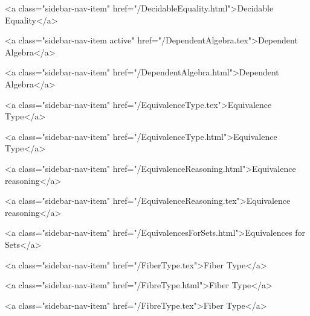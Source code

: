       
    
      
        
          <a class="sidebar-nav-item" href="/DecidableEquality.html">Decidable Equality</a>
        
      
    
      
        
          <a class="sidebar-nav-item active" href="/DependentAlgebra.tex">Dependent Algebra</a>
        
      
    
      
        
          <a class="sidebar-nav-item" href="/DependentAlgebra.html">Dependent Algebra</a>
        
      
    
      
        
          <a class="sidebar-nav-item" href="/EquivalenceType.tex">Equivalence Type</a>
        
      
    
      
        
          <a class="sidebar-nav-item" href="/EquivalenceType.html">Equivalence Type</a>
        
      
    
      
        
          <a class="sidebar-nav-item" href="/EquivalenceReasoning.html">Equivalence reasoning</a>
        
      
    
      
        
          <a class="sidebar-nav-item" href="/EquivalenceReasoning.tex">Equivalence reasoning</a>
        
      
    
      
        
          <a class="sidebar-nav-item" href="/EquivalencesForSets.html">Equivalences for Sets</a>
        
      
    
      
        
          <a class="sidebar-nav-item" href="/FiberType.tex">Fiber Type</a>
        
      
    
      
        
          <a class="sidebar-nav-item" href="/FibreType.html">Fiber Type</a>
        
      
    
      
        
          <a class="sidebar-nav-item" href="/FibreType.tex">Fiber Type</a>
        

